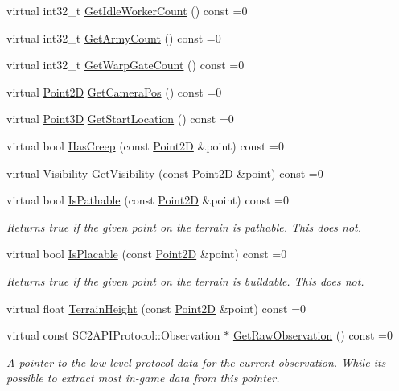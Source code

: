 \begin{DoxyCompactItemize}
virtual int32\+\_\+t \hyperlink{classsc2_1_1_observation_interface_aa02a57eddba0fca44df116439979f8b7}{Get\+Idle\+Worker\+Count} () const =0
\item 
virtual int32\+\_\+t \hyperlink{classsc2_1_1_observation_interface_a1ab99209855a20aae751684e1af19aaa}{Get\+Army\+Count} () const =0
\item 
virtual int32\+\_\+t \hyperlink{classsc2_1_1_observation_interface_ade7028b262089975621a18c54d4cddb3}{Get\+Warp\+Gate\+Count} () const =0
\item 
virtual \hyperlink{structsc2_1_1_point2_d}{Point2D} \hyperlink{classsc2_1_1_observation_interface_ae0415e17a101e959a412e97f5db39358}{Get\+Camera\+Pos} () const =0
\item 
virtual \hyperlink{structsc2_1_1_point3_d}{Point3D} \hyperlink{classsc2_1_1_observation_interface_a67b41bf8b933702e2d83db5f7f2095f3}{Get\+Start\+Location} () const =0
\item 
virtual bool \hyperlink{classsc2_1_1_observation_interface_a155ebc1b654779ca8bd489d13d91d57c}{Has\+Creep} (const \hyperlink{structsc2_1_1_point2_d}{Point2D} \&point) const =0
\item 
virtual Visibility \hyperlink{classsc2_1_1_observation_interface_ab17337d7e05f1e9cf80252da10f01b04}{Get\+Visibility} (const \hyperlink{structsc2_1_1_point2_d}{Point2D} \&point) const =0
\item 
virtual bool \hyperlink{classsc2_1_1_observation_interface_a09ba9ccd3b9c32a6e57d80da3e739a49}{Is\+Pathable} (const \hyperlink{structsc2_1_1_point2_d}{Point2D} \&point) const =0
\begin{DoxyCompactList}\small\item\em Returns \textquotesingle{}true\textquotesingle{} if the given point on the terrain is pathable. This does not. \end{DoxyCompactList}\item 
virtual bool \hyperlink{classsc2_1_1_observation_interface_aceb3be53ab7a68e268169e6f786e61f6}{Is\+Placable} (const \hyperlink{structsc2_1_1_point2_d}{Point2D} \&point) const =0
\begin{DoxyCompactList}\small\item\em Returns \textquotesingle{}true\textquotesingle{} if the given point on the terrain is buildable. This does not. \end{DoxyCompactList}\item 
virtual float \hyperlink{classsc2_1_1_observation_interface_a8e6d0c2bce48f675b3d4b99f925dfafb}{Terrain\+Height} (const \hyperlink{structsc2_1_1_point2_d}{Point2D} \&point) const =0
\item 
virtual const S\+C2\+A\+P\+I\+Protocol\+::\+Observation $\ast$ \hyperlink{classsc2_1_1_observation_interface_a375edbd0639c948d8c83bdcd4ebd4932}{Get\+Raw\+Observation} () const =0
\begin{DoxyCompactList}\small\item\em A pointer to the low-\/level protocol data for the current observation. While it\textquotesingle{}s possible to extract most in-\/game data from this pointer. \end{DoxyCompactList}\end{DoxyCompactItemize}



